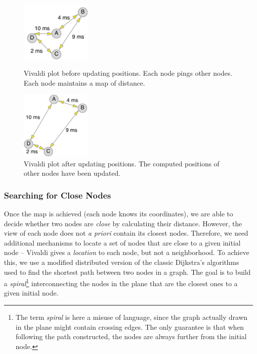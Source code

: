 \begin{figure}[!b]
	\vspace*{-.3cm}
  \begin{minipage}[c]{.45\linewidth}
   \hspace*{-0.5cm}
      	\centering \includegraphics[width=3.4cm]{./FIGS/vivaldi_before.pdf}

   \hspace*{0.5cm}
		\caption{Vivaldi plot before updating positions. Each node pings other nodes. Each node maintains a map of distance.}
\label{fig:vivaldi_before}
   \end{minipage}
\hspace*{0.6cm}
   \begin{minipage}[c]{.45\linewidth}
   	\centering \includegraphics[width=3.4cm]{./FIGS/vivaldi_after.pdf}
		\caption{Vivaldi plot after updating positions. The computed
                  positions of other nodes have been updated.}
		\label{fig:vivaldi_after} 
  \end{minipage} \hfill
\end{figure}


\subsubsection*{Searching for Close Nodes}

Once the map is achieved (each node knows its coordinates), we are able to decide
whether two nodes are \emph{close} by calculating their distance. However, the view of
each node does not \emph{a priori} contain its closest nodes. Therefore, we need additional
mechanisms to locate a set of nodes that are close to a given initial node --
Vivaldi gives a \emph{location} to each node, but not a neighborhood. To achieve
this, we use a modified distributed version of the classic Dijkstra's algorithms
used to find the shortest path between two nodes in a graph. The goal is to
build a \emph{spiral}\footnote{The term \emph{spiral} is here a misuse of
language, since the graph actually drawn in the plane
might contain crossing edges. The only guarantee is that when following the
path constructed, the nodes are always further from the initial node.}
interconnecting the nodes in the plane that are the closest ones to a given initial
node.

